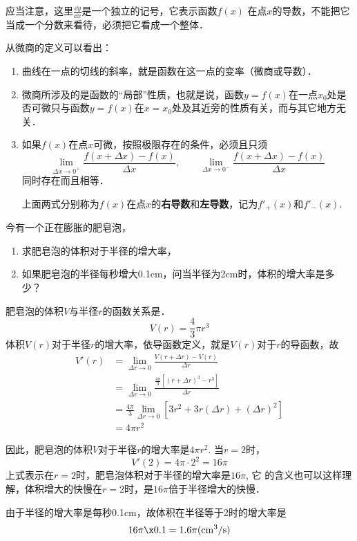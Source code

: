 应当注意，这里$\frac{\dd y}{\dd x}$是一个独立的记号，它表示函数$f(x)$
在点$x$的导数，不能把它当成一个分数来看待，必须把它看成一个整体．

从微商的定义可以看出：
\begin{enumerate}
\item 曲线在一点的切线的斜率，就是函数在这一点的变率（微商或导数）．    
\item 微商所涉及的是函数的“局部”性质，也就是说，函数$y=f(x)$在一点$x_0$处是否可微只与函数$y=f(x)$在$x=x_0$处及其近旁的性质有关，而与其它地方无关．    
\item 如果$f(x)$在点$x$可微，按照极限存在的条件，必须且只须
\[\lim_{\Delta x\to 0^+}\frac{f (x+\Delta x) -f (x)}{\Delta x},\qquad \lim_{\Delta x\to 0^-}\frac{f (x+\Delta x) -f (x)}{\Delta x}\]
同时存在而且相等．

上面两式分别称为$f(x)$在点$x$的\textbf{右导数}和\textbf{左导数}，记为$f'_+(x)$和$f'_-(x)$.
\end{enumerate}

\begin{example}
今有一个正在膨胀的肥皂泡，
\begin{enumerate}
\item 求肥皂泡的体积对于半径的增大率，
\item 如果肥皂泡的半径每秒增大0.1cm，问当半径为2cm时，体积的增大率是多少？
\end{enumerate}
\end{example}

\begin{solution}
    肥皂泡的体积$V$与半径$r$的函数关系是．
\[ V(r) =\frac{4}{3}\pi r^3\]
体积$V(r)$对于半径$r$的增大率，依导函数定义，就是$V(r)$对于$r$的导函数，故
\begin{align*}
    V'(r)&=\lim_{\Delta r\to 0}\frac{V(r+\Delta r)-V(r)}{\Delta r}\\
    &=\lim_{\Delta r\to 0}\frac{\frac{4\pi }{3}[(r+\Delta r)^3-r^3]}{\Delta r}\\
    &=\frac{4\pi }{3}\lim_{\Delta r\to 0}[3r^2+3r(\Delta r)+(\Delta r)^2]\\
    &=4\pi r^2
\end{align*}

因此，肥皂泡的体积$V$对于半径$r$的增大率是$4\pi r^2$. 当$r=2$时，\[V'(2)=4\pi \cdot 2^2=16\pi \]
上式表示在$r=2$时，肥皂泡体积对于半径的增大率是$16\pi$, 它
的含义也可以这样理解，体积增大的快慢在$r=2$时，是$16\pi$倍于半径增大的快慢．

由于半径的增大率是每秒0.1cm，故体积在半径等于2时的增大率是
\[16\pi \x0.1=1.6\pi ({\rm cm^3/s})\]
\end{solution}

